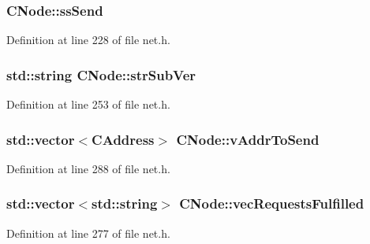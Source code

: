 \hypertarget{class_c_node_a6174b5a3d8d8f6a2daf02be3cf04dc63}{}
\subsubsection[{ss\+Send}]{ C\+Node\+::ss\+Send}\label{class_c_node_a6174b5a3d8d8f6a2daf02be3cf04dc63}


Definition at line 228 of file net.\+h.

\hypertarget{class_c_node_afb24fb33019af5c4085412fe3898cf01}{}
\subsubsection[{str\+Sub\+Ver}]{\setlength{\rightskip}{0pt plus 5cm}std\+::string C\+Node\+::str\+Sub\+Ver}\label{class_c_node_afb24fb33019af5c4085412fe3898cf01}


Definition at line 253 of file net.\+h.

\hypertarget{class_c_node_a9b2d9b9182ff111c79f704594c4aa2e1}{}
\subsubsection[{v\+Addr\+To\+Send}]{\setlength{\rightskip}{0pt plus 5cm}std\+::vector$<${\bf C\+Address}$>$ C\+Node\+::v\+Addr\+To\+Send}\label{class_c_node_a9b2d9b9182ff111c79f704594c4aa2e1}


Definition at line 288 of file net.\+h.

\hypertarget{class_c_node_a212cf268fdb1903f61993319175f023e}{}
\subsubsection[{vec\+Requests\+Fulfilled}]{\setlength{\rightskip}{0pt plus 5cm}std\+::vector$<$std\+::string$>$ C\+Node\+::vec\+Requests\+Fulfilled\hspace{0.3cm}{\ttfamily [protected]}}\label{class_c_node_a212cf268fdb1903f61993319175f023e}


Definition at line 277 of file net.\+h.

